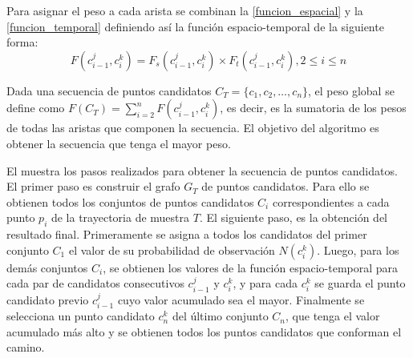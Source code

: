 Para asignar el peso a cada arista se combinan la \cref{funcion_espacial} y la \cref{funcion_temporal} definiendo así la función espacio-temporal de la siguiente forma:
\begin{equation} \label{funcion_espacio_temporal}
F(c_{i-1}^{j},c_{i}^{k}) = F_s(c_{i-1}^{j},c_{i}^{k}) \times F_{ t }(c_{ i-1 }^{ j },c_{ i }^{ k }), 2 \leq i \leq n
\end{equation}

Dada una secuencia de puntos candidatos $C_T = \{c_1, c_2, \dots, c_n\}$, el peso global se define como $F(C_T) = \sum _{ i=2 }^{ n }{F(c_{i-1}^{j},c_{i}^{k})}$, es decir, es la sumatoria de los pesos de todas las aristas que componen la secuencia. El objetivo del algoritmo es obtener la secuencia que tenga el mayor peso.

El  muestra los pasos realizados para obtener la secuencia de puntos candidatos. El primer paso es construir el grafo $G_T$ de puntos candidatos. Para ello se obtienen todos los conjuntos de puntos candidatos $C_i$ correspondientes a cada punto $p_i$ de la trayectoria de muestra $T$. El siguiente paso, es la obtención del resultado final. Primeramente se asigna a todos los candidatos del primer conjunto $C_1$ el valor de su probabilidad de observación $N(c_i^k)$. Luego, para los demás conjuntos $C_i$, se obtienen los valores de la función espacio-temporal para cada par de candidatos consecutivos $c_{i-1}^j$ y $c_i^k$, y para cada $c_i^k$ se guarda el punto candidato previo $c_{i-1}^j$ cuyo valor acumulado sea el mayor. Finalmente se selecciona un punto candidato $c_n^k$ del último conjunto $C_n$, que tenga el valor acumulado más alto y se obtienen todos los puntos candidatos que conforman el camino.

